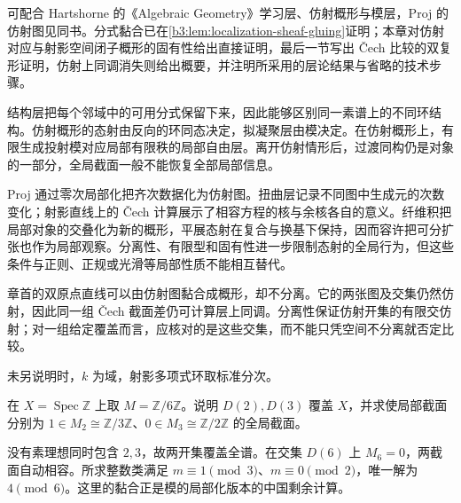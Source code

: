 \ProseParagraphBreak
可配合 Hartshorne 的《Algebraic Geometry》\cite[Chapter II, \S\S 1--2 and \S 5]{Hartshorne1977}学习层、仿射概形与模层，Proj 的仿射图见同书\cite[Chapter II, Proposition 2.5, pp. 76--77]{Hartshorne1977}。分式黏合已在\cref{b3:lem:localization-sheaf-gluing}证明；本章对仿射对应与射影空间闭子概形的固有性给出直接证明，最后一节写出 Čech 比较的双复形证明，仿射上同调消失则给出概要，并注明所采用的层论结果与省略的技术步骤。







\begin{chaptersummary}
	结构层把每个邻域中的可用分式保留下来，因此能够区别同一素谱上的不同环结构。仿射概形的态射由反向的环同态决定，拟凝聚层由模决定。在仿射概形上，有限生成投射模对应局部有限秩的局部自由层。离开仿射情形后，过渡同构仍是对象的一部分，全局截面一般不能恢复全部局部信息。

	\ProseParagraphBreak
	Proj 通过零次局部化把齐次数据化为仿射图。扭曲层记录不同图中生成元的次数变化；射影直线上的 Čech 计算展示了相容方程的核与余核各自的意义。纤维积把局部对象的交叠化为新的概形，平展态射在复合与换基下保持，因而容许把可分扩张也作为局部观察。分离性、有限型和固有性进一步限制态射的全局行为，但这些条件与正则、正规或光滑等局部性质不能相互替代。

	\ProseParagraphBreak
	章首的双原点直线可以由仿射图黏合成概形，却不分离。它的两张图及交集仍然仿射，因此同一组 Čech 截面差仍可计算层上同调。分离性保证仿射开集的有限交仿射；对一组给定覆盖而言，应核对的是这些交集，而不能只凭空间不分离就否定比较。
\end{chaptersummary}

\BookExercises
未另说明时，\(k\) 为域，射影多项式环取标准分次。

\begin{optionalexercise}\label{b3:ex:24-local-gluing-crt}
	在 \(X=\operatorname{Spec}\mathbb Z\) 上取 \(M=\mathbb Z/6\mathbb Z\)。说明 \(D(2),D(3)\) 覆盖 \(X\)，并求使局部截面分别为 \(1\in M_2\cong\mathbb Z/3\mathbb Z\)、\(0\in M_3\cong\mathbb Z/2\mathbb Z\) 的全局截面。
\end{optionalexercise}
\begin{solution}
	没有素理想同时包含 \(2,3\)，故两开集覆盖全谱。在交集 \(D(6)\) 上 \(M_6=0\)，两截面自动相容。所求整数类满足 \(m\equiv1\pmod3\)、\(m\equiv0\pmod2\)，唯一解为 \(4\pmod6\)。这里的黏合正是模的局部化版本的中国剩余计算。
\end{solution}

